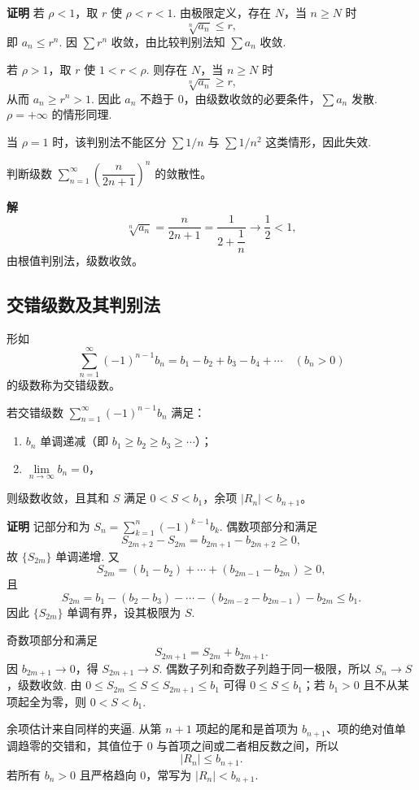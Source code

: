 \documentclass[fontset=fandol]{ctexart}
\newenvironment{custom}[1]{\par\noindent\textbf{#1}\quad}{\par\vspace{0.8em}}
\begin{document}
\begin{custom}{证明}
若 $\rho<1$，取 $r$ 使 $\rho<r<1$. 由极限定义，存在 $N$，当 $n\ge N$ 时
\[
\sqrt[n]{a_n}\le r,
\]
即 $a_n\le r^n$. 因 $\sum r^n$ 收敛，由比较判别法知 $\sum a_n$ 收敛.

若 $\rho>1$，取 $r$ 使 $1<r<\rho$. 则存在 $N$，当 $n\ge N$ 时
\[
\sqrt[n]{a_n}\ge r,
\]
从而 $a_n\ge r^n>1$. 因此 $a_n$ 不趋于 $0$，由级数收敛的必要条件，$\sum a_n$ 发散. $\rho=+\infty$ 的情形同理.

当 $\rho=1$ 时，该判别法不能区分 $\sum 1/n$ 与 $\sum 1/n^2$ 这类情形，因此失效.
\end{custom}

\begin{example}
判断级数 \(\sum_{n=1}^{\infty} \left(\dfrac{n}{2n+1}\right)^n\) 的敛散性。
\end{example}
\begin{custom}{解}
\[
\sqrt[n]{a_n} = \dfrac{n}{2n+1} = \dfrac{1}{2 + \dfrac{1}{n}} \to \dfrac{1}{2} < 1,
\]
由根值判别法，级数收敛。
\end{custom}

\subsection{交错级数及其判别法}

\begin{definition}[交错级数]
形如
\[
\sum_{n=1}^{\infty} (-1)^{n-1} b_n = b_1 - b_2 + b_3 - b_4 + \cdots \quad (b_n > 0)
\]
的级数称为交错级数。
\end{definition}

\begin{theorem}[莱布尼茨判别法]
若交错级数 \(\sum_{n=1}^{\infty} (-1)^{n-1} b_n\) 满足：
\begin{enumerate}
\item \(b_n\) 单调递减（即 \(b_1 \geq b_2 \geq b_3 \geq \cdots\)）；
\item \(\lim\limits_{n\to\infty} b_n = 0\)，
\end{enumerate}
则级数收敛，且其和 \(S\) 满足 \(0 < S < b_1\)，余项 \(|R_n| < b_{n+1}\)。
\end{theorem}

\begin{custom}{证明}
记部分和为 $S_n=\sum_{k=1}^{n}(-1)^{k-1}b_k$. 偶数项部分和满足
\[
S_{2m+2}-S_{2m}=b_{2m+1}-b_{2m+2}\ge0,
\]
故 $\{S_{2m}\}$ 单调递增. 又
\[
S_{2m}=(b_1-b_2)+\cdots+(b_{2m-1}-b_{2m})\ge0,
\]
且
\[
S_{2m}=b_1-(b_2-b_3)-\cdots-(b_{2m-2}-b_{2m-1})-b_{2m}\le b_1.
\]
因此 $\{S_{2m}\}$ 单调有界，设其极限为 $S$.

奇数项部分和满足
\[
S_{2m+1}=S_{2m}+b_{2m+1}.
\]
因 $b_{2m+1}\to0$，得 $S_{2m+1}\to S$. 偶数子列和奇数子列趋于同一极限，所以 $S_n\to S$，级数收敛. 由 $0\le S_{2m}\le S\le S_{2m+1}\le b_1$ 可得 $0\le S\le b_1$；若 $b_1>0$ 且不从某项起全为零，则 $0<S<b_1$.

余项估计来自同样的夹逼. 从第 $n+1$ 项起的尾和是首项为 $b_{n+1}$、项的绝对值单调趋零的交错和，其值位于 $0$ 与首项之间或二者相反数之间，所以
\[
|R_n|\le b_{n+1}.
\]
若所有 $b_n>0$ 且严格趋向 $0$，常写为 $|R_n|<b_{n+1}$.
\end{custom}
\end{document}
